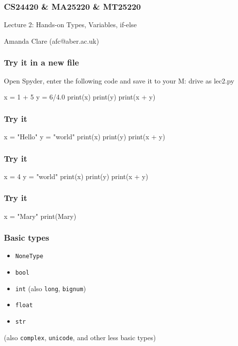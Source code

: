 \documentclass{beamer}
\begin{document}

\begin{frame}
\frametitle{CS24420 \& MA25220 \& MT25220}

\begin{center}
\begin{huge}
Lecture 2: Hands-on Types, Variables, if-else
\end{huge}
\bigskip

Amanda Clare (afc@aber.ac.uk)

\end{center}
\end{frame}


\begin{frame}[fragile]
\frametitle{Try it in a new file}
Open Spyder, enter the following code and save it to your M: drive as lec2.py
\begin{code}
x = 1 + 5
y = 6/4.0
print(x)
print(y)
print(x + y)
\end{code}
\end{frame}

\begin{frame}[fragile]
\frametitle{Try it}
\begin{code}
x = "Hello"
y = "world"
print(x)
print(y)
print(x + y)
\end{code}
\end{frame}


\begin{frame}[fragile]
\frametitle{Try it}
\begin{code}
x = 4
y = "world"
print(x)
print(y)
print(x + y)
\end{code}
\end{frame}

\begin{frame}[fragile]
\frametitle{Try it}
\begin{code}
x = "Mary"
print(Mary)
\end{code}
\end{frame}



\begin{frame}
\frametitle{Basic types}
\begin{itemize}
\item {\tt NoneType}
\item {\tt bool}
\item {\tt int} (also {\tt long}, {\tt bignum})
\item {\tt float}
\item {\tt str} 
\end{itemize}
(also {\tt complex}, {\tt unicode}, and other less basic types)
\end{frame}
\end{document}
